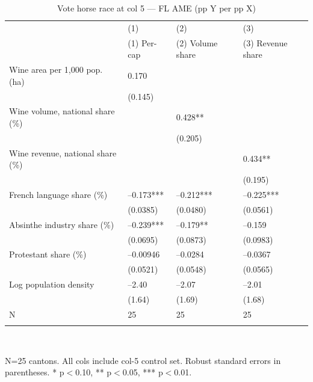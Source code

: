 \begin{table}[tbp] \centering
{}

\caption{Vote horse race at col 5 --- FL AME (pp Y per pp X)}
\label{tab:T3_FL}
\begin{tabularx}{\linewidth}{@{}lCCC@{}}

\toprule
&{(1)}&{(2)}&{(3)} \tabularnewline
 & (1) Per-cap & (2) Volume share & (3) Revenue share \tabularnewline 
\midrule \addlinespace[\belowrulesep]
Wine area per 1,000 pop. (ha)&0.170&& \tabularnewline
&(0.145)&& \tabularnewline
Wine volume, national share (\%)&&0.428**& \tabularnewline
&&(0.205)& \tabularnewline
Wine revenue, national share (\%)&&&0.434** \tabularnewline
&&&(0.195) \tabularnewline
French language share (\%)&--0.173***&--0.212***&--0.225*** \tabularnewline
&(0.0385)&(0.0480)&(0.0561) \tabularnewline
Absinthe industry share (\%)&--0.239***&--0.179**&--0.159 \tabularnewline
&(0.0695)&(0.0873)&(0.0983) \tabularnewline
Protestant share (\%)&--0.00946&--0.0284&--0.0367 \tabularnewline
&(0.0521)&(0.0548)&(0.0565) \tabularnewline
Log population density&--2.40&--2.07&--2.01 \tabularnewline
&(1.64)&(1.69)&(1.68) \tabularnewline
\midrule N&25&25&25 \tabularnewline
\bottomrule \addlinespace[\belowrulesep]

\end{tabularx}
\\ \parbox{\linewidth}{\footnotesize N=25 cantons. All cols include col-5 control set. Robust standard errors in parentheses. * p\(<\)0.10, ** p\(<\)0.05, *** p\(<\)0.01.}
\end{table}
